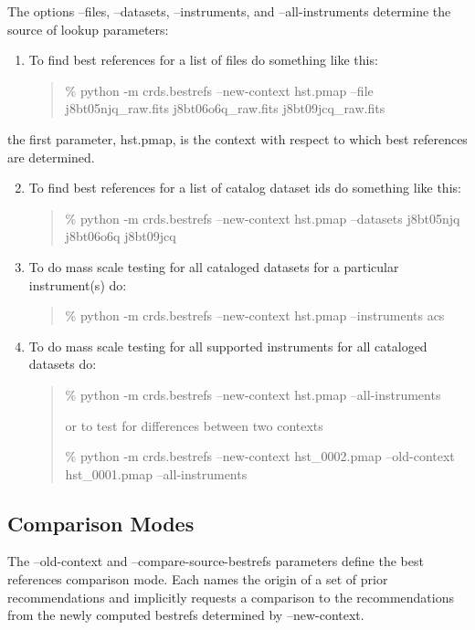 \documentclass[letterpaper,10pt,english]{sphinxmanual}
\begin{document}
The options --files, --datasets, --instruments, and --all-instruments determine the source of lookup parameters:
\begin{enumerate}
\item {} 
To find best references for a list of files do something like this:
\begin{quote}

\% python -m crds.bestrefs --new-context hst.pmap --file j8bt05njq\_raw.fits j8bt06o6q\_raw.fits j8bt09jcq\_raw.fits
\end{quote}

\end{enumerate}

the first parameter, hst.pmap,  is the context with respect to which best references are determined.
\begin{enumerate}
\setcounter{enumi}{1}
\item {} 
To find best references for a list of catalog dataset ids do something like this:
\begin{quote}

\% python -m crds.bestrefs --new-context hst.pmap --datasets j8bt05njq j8bt06o6q j8bt09jcq
\end{quote}

\item {} 
To do mass scale testing for all cataloged datasets for a particular instrument(s) do:
\begin{quote}

\% python -m crds.bestrefs --new-context hst.pmap --instruments acs
\end{quote}

\item {} 
To do mass scale testing for all supported instruments for all cataloged datasets do:
\begin{quote}

\% python -m crds.bestrefs --new-context hst.pmap --all-instruments

or to test for differences between two contexts

\% python -m crds.bestrefs --new-context hst\_0002.pmap --old-context hst\_0001.pmap --all-instruments
\end{quote}

\end{enumerate}


\subsection{Comparison Modes}
\label{command_line_tools:comparison-modes}
The --old-context and --compare-source-bestrefs parameters define the best references comparison mode.  Each names
the origin of a set of prior recommendations and implicitly requests a comparison to the recommendations from
the newly computed bestrefs determined by --new-context.
\end{document}

